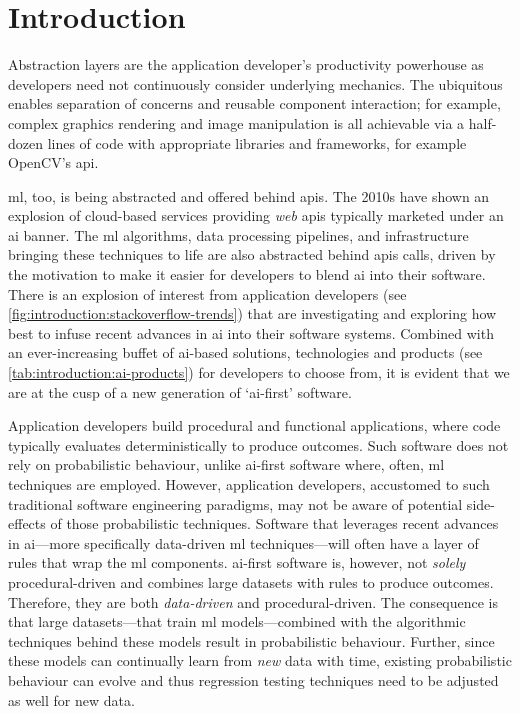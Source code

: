 \chapter{Introduction}
\label{ch:introduction}
\graphicspath{{mainmatter/introduction/figures/}}

Abstraction layers are the application developer's productivity powerhouse as developers need not continuously consider underlying mechanics. The ubiquitous  enables separation of concerns and reusable component interaction; for example, complex graphics rendering and image manipulation is all achievable via a half-dozen lines of code with appropriate libraries and frameworks, for example OpenCV's \gls{api}.

\Gls{ml}, too, is being abstracted and offered behind \glspl{api}. The 2010s have shown an explosion of cloud-based services providing \textit{web} \glspl{api} typically marketed under an \gls{ai} banner. The \gls{ml} algorithms, data processing pipelines, and infrastructure bringing these techniques to life are also abstracted behind \glspl{api} calls, driven by the motivation to make it easier for developers to blend \gls{ai} into their software.
There is an explosion of interest from application developers (see \cref{fig:introduction:stackoverflow-trends}) that are investigating and exploring how best to infuse recent advances in \gls{ai} into their software systems. Combined with an ever-increasing buffet of \gls{ai}-based solutions, technologies and products (see \cref{tab:introduction:ai-products}) for developers to choose from, it is evident that we are at the cusp of a new generation of `\gls{ai}-first' software.

Application developers build procedural and functional applications, where code typically evaluates deterministically to produce outcomes. Such software does not rely on probabilistic behaviour, unlike \gls{ai}-first software where, often, \gls{ml} techniques are employed. However, application developers, accustomed to such traditional software engineering paradigms, may not be aware of potential side-effects of those probabilistic techniques. Software that leverages recent advances in \gls{ai}---more specifically data-driven \gls{ml} techniques---will often have a layer of rules that wrap the \gls{ml} components.
\Gls{ai}-first software is, however, not \textit{solely} procedural-driven and combines large datasets with rules to produce outcomes. Therefore, they are both \textit{data-driven} and procedural-driven. The consequence is that large datasets---that train \gls{ml} models---combined with the algorithmic techniques behind these models result in probabilistic behaviour. Further, since these models can continually learn from \textit{new} data with time, existing probabilistic behaviour can evolve and thus regression testing techniques need to be adjusted as well for new data. 

